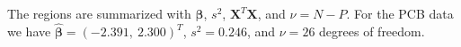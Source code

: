 \documentclass[11pt,a4paper]{article}
\begin{document}

The regions are summarized with \(\widehat{\boldsymbol{\beta}}\), \(s^{2}\),
\(\boldsymbol{X}^{T}\boldsymbol{X}\), and \(\nu = N - P\). For the PCB data we
have \(\widehat{\boldsymbol{\beta}} = ( - 2.391,\ 2.300)^{T}\),
\(s^{2} = 0.246\), and \(\nu = 26\) degrees of freedom.
\end{document}
